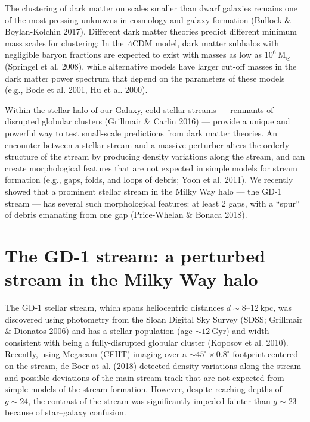 \documentclass[11pt]{article}
\date{}
\author{}
\newcommand{\msun}{\textrm{M}_\odot}
\begin{document}
\maketitle

\vspace{-1em}
The clustering of dark matter on scales smaller than dwarf galaxies remains one of the most pressing unknowns in cosmology and galaxy formation (Bullock \& Boylan-Kolchin 2017).
Different dark matter theories predict different minimum mass scales for clustering: In the $\Lambda$CDM model, dark matter subhalos with negligible baryon fractions are expected to exist with masses as low as $10^{6}~\msun$ (Springel et al. 2008), while alternative models have larger cut-off masses in the dark matter power spectrum that depend on the parameters of these models (e.g., Bode et al. 2001, Hu et al. 2000).

Within the stellar halo of our Galaxy, cold stellar streams --- remnants of disrupted globular clusters (Grillmair \& Carlin 2016) --- provide a unique and powerful way to test small-scale predictions from dark matter theories.
An encounter between a stellar stream and a massive perturber alters the orderly structure of the stream by producing density variations along the stream, and can create morphological features that are not expected in simple models for stream formation (e.g., gaps, folds, and loops of debris; Yoon et al. 2011).
We recently showed that a prominent stellar stream in the Milky Way halo --- the GD-1 stream --- has several such morphological features: at least 2 gaps, with a ``spur'' of debris emanating from one gap (Price-Whelan \& Bonaca 2018).

\section*{The GD-1 stream: a perturbed stream in the Milky Way halo}

The GD-1 stellar stream, which spans heliocentric distances $d\sim 8$--$12~\textrm{kpc}$, was discovered using photometry from the Sloan Digital Sky Survey (SDSS; Grillmair \& Dionatos 2006) and has a stellar population (age $\sim 12~\textrm{Gyr}$) and width consistent with being a fully-disrupted globular cluster (Koposov et al. 2010).
Recently, using Megacam (CFHT) imaging over a $\sim 45^\circ \times 0.8^\circ$ footprint centered on the stream, de Boer at al. (2018) detected density variations along the stream and possible deviations of the main stream track that are not expected from simple models of the stream formation.
However, despite reaching depths of $g \sim 24$, the contrast of the stream was significantly impeded fainter than $g \sim 23$ because of star--galaxy confusion.
\end{document}
